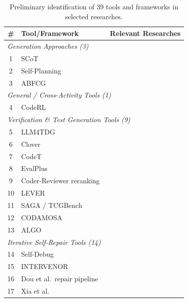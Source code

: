 \documentclass[10pt,a4paper]{article}
\begin{document}
\begin{table}[p]
\centering
\caption{Preliminary identification of 39 tools and frameworks in selected researches.}
\label{tab:tools_prelim}
\small
\begin{tabular}{@{}clp{7.5cm}@{}}
\toprule
\textbf{\#} & \textbf{Tool/Framework} & \textbf{Relevant Researches} \\
\midrule
\multicolumn{3}{l}{\textit{Generation Approaches (3)}} \\
\midrule
1 & SCoT~\cite{li2025scot} & \cite{li2025scot} \\
2 & Self-Planning~\cite{jiang2024selfplan} & \cite{jiang2024selfplan} \\
3 & ABFCG~\cite{zhang2025abfcg} & \cite{zhang2025abfcg} \\
\midrule
\multicolumn{3}{l}{\textit{General / Cross-Activity Tools (1)}} \\
\midrule
4 & CodeRL~\cite{le2022coderl} & \cite{le2022coderl} \\
\midrule
\multicolumn{3}{l}{\textit{Verification \& Test Generation Tools (9)}} \\
\midrule
5 & LLM4TDG~\cite{liu2025llm4tdg} & \cite{liu2025llm4tdg} \\
6 & Clover~\cite{sun2024clover} & \cite{sun2024clover} \\
7 & CodeT~\cite{chenbei2023} & \cite{chenbei2023} \\
8 & EvalPlus~\cite{liu2023evalplus} & \cite{liu2023evalplus} \\
9 & Coder-Reviewer reranking~\cite{zhangt2023coderreviewer} & \cite{zhangt2023coderreviewer} \\
10 & LEVER~\cite{ni2023lever} & \cite{ni2023lever} \\
11 & SAGA / TCGBench~\cite{ma2025saga} & \cite{ma2025saga} \\
12 & CODAMOSA~\cite{lemieux2023codamosa} & \cite{lemieux2023codamosa} \\
13 & ALGO~\cite{zhang2023algo} & \cite{zhang2023algo} \\
\midrule
\multicolumn{3}{l}{\textit{Iterative Self-Repair Tools (14)}} \\
\midrule
14 & Self-Debug~\cite{chen2023selfdebug} & \cite{chen2023selfdebug,dou2026} \\
15 & INTERVENOR~\cite{wang2024intervenor} & \cite{wang2024intervenor,dou2026} \\
16 & Dou et al.\ repair pipeline~\cite{dou2026} & \cite{dou2026} \\
17 & Xia et al.~\cite{xia2023apr} & \cite{xia2023apr} \\

\end{tabular}
\end{table}
\end{document}
